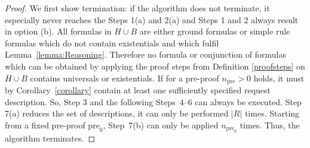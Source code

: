 \begin{proof}
We first show termination:
if the algorithm does not terminate, it especially never reaches the Steps 1(a) and 2(a) and
%
Steps 1 and 2 always result in option (b). 
All formulas in $H\cup B$ are either ground formulas
or simple rule formulas %
which do not contain existentials 
and which fulfil Lemma~\ref{lemma:Reasoning}.
Therefore no formula or conjunction of formulas
which can be obtained by applying the proof steps from Definition \ref{proofsteps}
on $H\cup B$
contains universals %
or existentials.
If for a pre-proof $n_{\text{pre}}>0$ holds, it must 
by Corollary~\ref{corollary} %
contain at least one
sufficiently specified \http request description. So, Step 3 and the following Steps~4--6 can always be executed.
Step 7(a) reduces the set of \restdesc descriptions, it can only be performed $|R|$ times.
Starting from a fixed pre-proof $\text{pre}_0$, Step~7(b) can only be applied $n_{\text{pre}_0}$ times.
Thus, the algorithm terminates.%


\end{proof}
